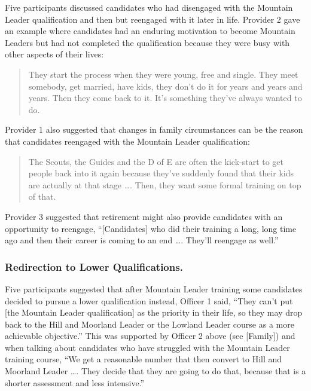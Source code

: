 \documentclass[
  12pt,
  a4paper,
]{book}
\begin{document}
Five participants discussed candidates who had disengaged with the Mountain Leader qualification and then but reengaged with it later in life. Provider 2 gave an example where candidates had an enduring motivation to become Mountain Leaders but had not completed the qualification because they were busy with other aspects of their lives:

\begin{quote}
They start the process when they were young, free and single. They meet somebody, get married, have kids, they don't do it for years and years and years. Then they come back to it. It's something they've always wanted to do.
\end{quote}

Provider 1 also suggested that changes in family circumstances can be the reason that candidates reengaged with the Mountain Leader qualification:

\begin{quote}
The Scouts, the Guides and the D of E are often the kick-start to get people back into it again because they've suddenly found that their kids are actually at that stage \ldots. Then, they want some formal training on top of that.
\end{quote}

Provider 3 suggested that retirement might also provide candidates with an opportunity to reengage, ``{[}Candidates{]} who did their training a long, long time ago and then their career is coming to an end \ldots. They'll reengage as well.''

\hypertarget{ml-qualitative-gta-redirection-lower}{%
\subsubsection{Redirection to Lower Qualifications.}\label{ml-qualitative-gta-redirection-lower}}

Five participants suggested that after Mountain Leader training some candidates decided to pursue a lower qualification instead, Officer 1 said, ``They can't put {[}the Mountain Leader qualification{]} as the priority in their life, so they may drop back to the Hill and Moorland Leader or the Lowland Leader course as a more achievable objective.'' This was supported by Officer 2 above (see {[}Family{]}) and when talking about candidates who have struggled with the Mountain Leader training course, ``We get a reasonable number that then convert to Hill and Moorland Leader \ldots. They decide that they are going to do that, because that is a shorter assessment and less intensive.''
\end{document}
